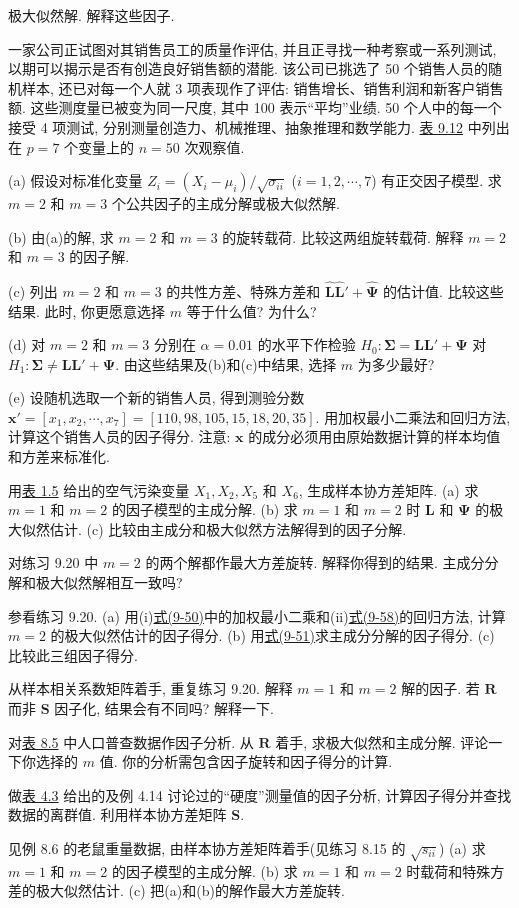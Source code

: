 
极大似然解. 解释这些因子.

\quad 一家公司正试图对其销售员工的质量作评估, 并且正寻找一种考察或一系列测试, 以期可以揭示是否有创造良好销售额的潜能. 该公司已挑选了 50 个销售人员的随机样本, 还已对每一个人就 3 项表现作了评估: 销售增长、销售利润和新客户销售额. 这些测度量已被变为同一尺度, 其中 100 表示“平均”业绩. 50 个人中的每一个接受 4 项测试, 分别测量创造力、机械推理、抽象推理和数学能力. \hyperref[tab:9.12]{表 9.12} 中列出在 $p=7$ 个变量上的 $n=50$ 次观察值.

(a) 假设对标准化变量 $Z_i=(X_i-\mu_i)/\sqrt{\sigma_{ii}}$ ($i=1,2,\cdots,7$) 有正交因子模型. 求 $m=2$ 和 $m=3$ 个公共因子的主成分解或极大似然解.

(b) 由(a)的解, 求 $m=2$ 和 $m=3$ 的旋转载荷. 比较这两组旋转载荷. 解释 $m=2$ 和 $m=3$ 的因子解.

(c) 列出 $m=2$ 和 $m=3$ 的共性方差、特殊方差和 $\hat{\mathbf{L}}\hat{\mathbf{L}}'+\hat{\boldsymbol{\Psi}}$ 的估计值. 比较这些结果. 此时, 你更愿意选择 $m$ 等于什么值? 为什么?

(d) 对 $m=2$ 和 $m=3$ 分别在 $\alpha=0.01$ 的水平下作检验 $H_0:\boldsymbol{\Sigma}=\mathbf{L}\mathbf{L}'+\boldsymbol{\Psi}$ 对 $H_1:\boldsymbol{\Sigma}\neq\mathbf{L}\mathbf{L}'+\boldsymbol{\Psi}$. 由这些结果及(b)和(c)中结果, 选择 $m$ 为多少最好?

(e) 设随机选取一个新的销售人员, 得到测验分数 $\mathbf{x}'=[x_1,x_2,\cdots,x_7]=[110,98,105,15,18,20,35]$. 用加权最小二乘法和回归方法, 计算这个销售人员的因子得分.
注意: $\mathbf{x}$ 的成分必须用由原始数据计算的样本均值和方差来标准化.

\quad 用\hyperref[tab:1.5]{表 1.5} 给出的空气污染变量 $X_1,X_2,X_5$ 和 $X_6$, 生成样本协方差矩阵.
(a) 求 $m=1$ 和 $m=2$ 的因子模型的主成分解.
(b) 求 $m=1$ 和 $m=2$ 时 $\mathbf{L}$ 和 $\boldsymbol{\Psi}$ 的极大似然估计.
(c) 比较由主成分和极大似然方法解得到的因子分解.

\quad 对练习 9.20 中 $m=2$ 的两个解都作最大方差旋转. 解释你得到的结果. 主成分分解和极大似然解相互一致吗?

\quad 参看练习 9.20.
(a) 用(i)\hyperref[eq:9-50]{式(9-50)}中的加权最小二乘和(ii)\hyperref[eq:9-58]{式(9-58)}的回归方法, 计算 $m=2$ 的极大似然估计的因子得分.
(b) 用\hyperref[eq:9-51]{式(9-51)}求主成分分解的因子得分.
(c) 比较此三组因子得分.

\quad 从样本相关系数矩阵着手, 重复练习 9.20. 解释 $m=1$ 和 $m=2$ 解的因子. 若 $\mathbf{R}$ 而非 $\mathbf{S}$ 因子化, 结果会有不同吗? 解释一下.

\quad 对\hyperref[tab:8.5]{表 8.5} 中人口普查数据作因子分析. 从 $\mathbf{R}$ 着手, 求极大似然和主成分解. 评论一下你选择的 $m$ 值. 你的分析需包含因子旋转和因子得分的计算.

\quad 做\hyperref[tab:4.3]{表 4.3} 给出的及例 4.14 讨论过的“硬度”测量值的因子分析, 计算因子得分并查找数据的离群值. 利用样本协方差矩阵 $\mathbf{S}$.

\quad 见例 8.6 的老鼠重量数据, 由样本协方差矩阵着手(见练习 8.15 的 $\sqrt{s_{ii}}$)
(a) 求 $m=1$ 和 $m=2$ 的因子模型的主成分解.
(b) 求 $m=1$ 和 $m=2$ 时载荷和特殊方差的极大似然估计.
(c) 把(a)和(b)的解作最大方差旋转.
